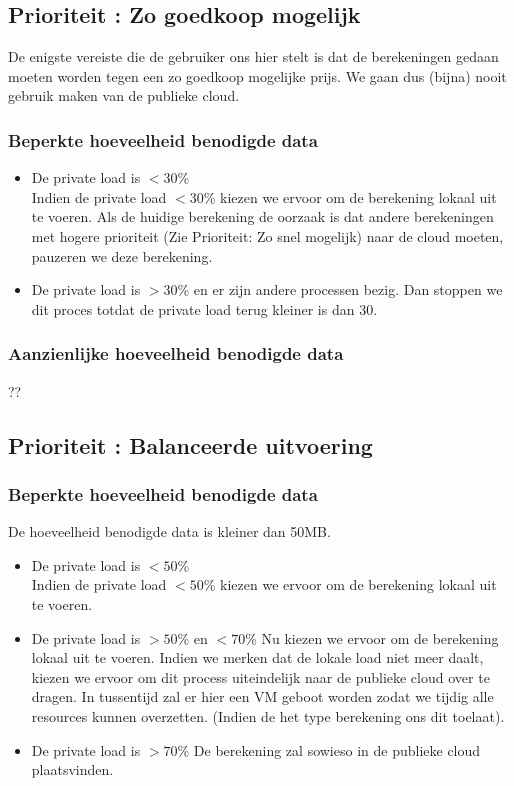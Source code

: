 \documentclass{article}
\begin{document}
\subsection{Prioriteit : Zo goedkoop mogelijk}
De enigste vereiste die de gebruiker ons hier stelt is dat de berekeningen gedaan moeten worden tegen een zo goedkoop mogelijke prijs.  We gaan dus (bijna) nooit gebruik maken van de publieke cloud.
\subsubsection{Beperkte hoeveelheid benodigde data}
\begin{itemize}
    \item De private load is $< 30$\% \\
    Indien de private load $< 30$\% kiezen we ervoor om de berekening lokaal uit te voeren.  Als de huidige berekening de oorzaak is dat andere berekeningen met hogere prioriteit (Zie Prioriteit: Zo snel mogelijk) naar de cloud moeten, pauzeren we deze berekening.
    \item De private load is $> 30$\% en er zijn andere processen bezig.
    Dan stoppen we dit proces totdat de private load terug kleiner is dan $30$.
\end{itemize}
\subsubsection{Aanzienlijke hoeveelheid benodigde data}
??
\subsection{Prioriteit : Balanceerde uitvoering}
\subsubsection{Beperkte hoeveelheid benodigde data}
De hoeveelheid benodigde data is kleiner dan 50MB.
\begin{itemize}
    \item De private load is $< 50$\% \\
    Indien de private load $< 50$\% kiezen we ervoor om de berekening lokaal uit te voeren. 
    \item De private load is $> 50$\% en $< 70$\%
    Nu kiezen we ervoor om de berekening lokaal uit te voeren.  Indien we merken dat de lokale load niet meer daalt, kiezen we ervoor om dit process uiteindelijk naar de publieke cloud over te dragen.
    In tussentijd zal er hier een VM geboot worden zodat we tijdig alle resources kunnen overzetten.  (Indien de het type berekening ons dit toelaat).
    \item De private load is $> 70$\%
    De berekening zal sowieso in de publieke cloud plaatsvinden.
\end{itemize}
\end{document}
